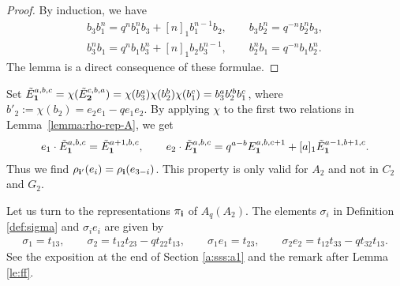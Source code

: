 \begin{proof}
By induction, we have
\begin{gather*}
{b_3 b_1^n} = q^n {b_1^n b_3}+[n]_1 {b_1^{n-1} b_2},  \qquad
{b_3 b_2^n} = q^{-n} {b_2^n b_3},\\
{b_3^n b_1} = q^n {b_1 b_3^n}+[n]_1 {b_2 b_3^{n-1}},  \qquad
{b_2^n b_1} = q^{-n} {b_1 b_2^n}.
\end{gather*}
The lemma is a direct consequence of these formulae.
\end{proof}

Set
${\tilde E}^{a,b,c}_{\bf 1} = \chi({\tilde E}^{c,b,a}_{\bf 2})
= \chi(b^a_3)\chi(b^b_2)\chi(b^c_1)
=b_3^ab_2^{\prime b}b_1^c$,
where $b'_2 := \chi(b_2) = e_2e_1-qe_1e_2$.
By applying $\chi$ to the f\/irst two relations
in Lemma~\ref{lemma:rho-rep-A}, we get
\begin{gather}\label{a:kore}
e_1\cdot {\tilde E}^{a,b,c}_{\bf 1} = {\tilde E}^{a+1,b,c}_{\bf 1},
\qquad
e_2\cdot {\tilde E}^{a,b,c}_{\bf 1} = q^{a-b}E^{a,b,c+1}_{\bf 1}
+[a]_1{\tilde E}^{a-1,b+1,c}_{\bf 1}.
\end{gather}
Thus we f\/ind $\rho_{{\bf i}'}(e_i) = \rho_{\bf i}(e_{3-i})$.
This property is only valid for $A_2$ and not in $C_2$ and $G_2$.

Let us turn to the representations $\pi_{{\bf i}}$ of $A_q(A_2)$.
The elements $\sigma_i$ in Def\/inition \ref{def:sigma}
and $\sigma_ie_i$
are given by{\samepage
\begin{gather}\label{a:kobetsu}
\sigma_1 = t_{13}, \qquad
\sigma_2 = t_{12}t_{23}-qt_{22}t_{13},\qquad
\sigma_1 e_1 = t_{23},\qquad
\sigma_2e_2 = t_{12}t_{33}-qt_{32}t_{13}.
\end{gather}
See the exposition at the end of Section \ref{a:sss:a1} and the remark after
Lemma \ref{le:ff}.}


